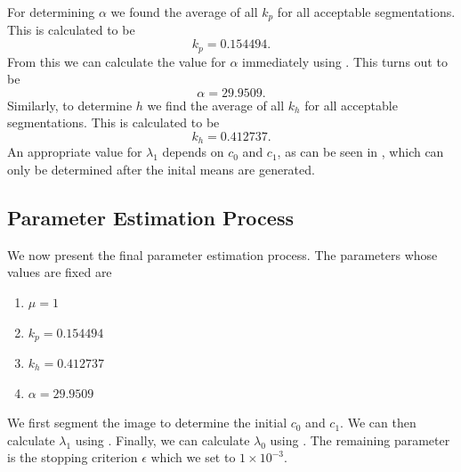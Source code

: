 \documentclass[10pt, journal, letterpaper, onecolumn, draftcls]{IEEEtran}
\begin{document}

For determining $\alpha$ we found the average of all $k_p$ for all acceptable segmentations. This is calculated to be
\begin{equation*}
	k_p = 0.154494.
\end{equation*}
From this we can calculate the value for $\alpha$ immediately using . This turns out to be
\begin{equation}
	\alpha = 29.9509.
\end{equation}
Similarly, to determine $h$ we find the average of all $k_h$ for all acceptable segmentations. This is calculated to be
\begin{equation*}
	k_h = 0.412737.
\end{equation*}
An appropriate value for $\lambda_1$ depends on $c_0$ and $c_1$, as can be seen in , which can only be determined after the inital means are generated.

\subsection{Parameter Estimation Process}
We now present the final parameter estimation process. The parameters whose values are fixed are
\begin{enumerate}
	\item $\mu=1$
	\item $k_p = 0.154494$
	\item $k_h = 0.412737$
	\item $\alpha = 29.9509$
\end{enumerate}
We first segment the image to determine the initial $c_0$ and $c_1$. We can then calculate $\lambda_1$ using . Finally, we can calculate $\lambda_0$ using .
The remaining parameter is the stopping criterion $\epsilon$ which we set to  $1 \times 10^{-3}$.
\end{document}
